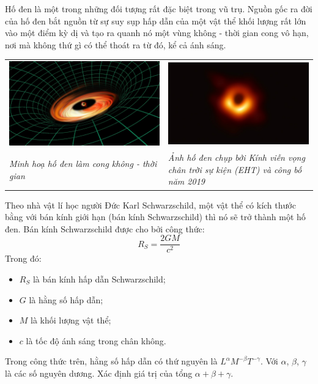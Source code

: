 \begin{ex}
	Hố đen là một trong những đối tượng rất đặc biệt trong vũ trụ. Nguồn gốc ra đời của hố đen bắt nguồn từ sự suy sụp hấp dẫn của một vật thể khối lượng rất lớn vào một điểm kỳ dị và tạo ra quanh nó một vùng không - thời gian cong vô hạn, nơi mà không thứ gì có thể thoát ra từ đó, kể cả ánh sáng. 
	\begin{center}
		\begin{tabular}{M{7.5cm}M{7.5cm}}
			\includegraphics[width=0.7\linewidth]{../figs/D10-2-5}
			&\includegraphics[width=0.7\linewidth]{../figs/D10-2-4}\\
			\textit{Minh hoạ hố đen làm cong không - thời gian}& \textit{Ảnh hố đen chụp bởi Kính viễn vọng chân trời sự kiện (EHT) và công bố năm 2019} 
		\end{tabular}
	\end{center}
	Theo nhà vật lí học người Đức Karl Schwarzschild, một vật thể có kích thước bằng với bán kính giới hạn (bán kính Schwarzschild) thì nó sẽ trở thành một hố đen. Bán kính  Schwarzschild được cho bởi công thức:
	$$R_S=\dfrac{2GM}{c^2}$$
	Trong đó:
	\begin{itemize}
		\item $R_S$ là bán kính hấp dẫn Schwarzschild;
		\item $G$ là hằng số hấp dẫn;
		\item $M$ là khối lượng vật thể;
		\item $c$ là tốc độ ánh sáng trong chân không.
	\end{itemize}
	Trong công thức trên, hằng số hấp dẫn có thứ nguyên là $L^\alpha M^{-\beta}T^{-\gamma}$. Với $\alpha$, $\beta$, $\gamma$ là các số nguyên dương. Xác định giá trị của tổng $\alpha+\beta+\gamma$.
	

\end{ex}
